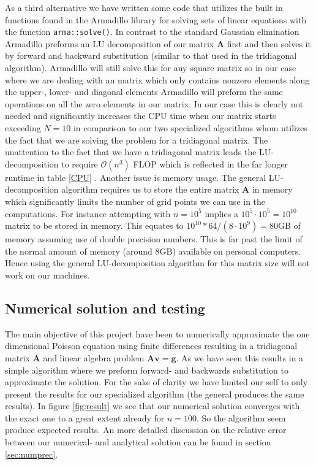 \documentclass[12pt]{article}
\numberwithin{figure}{section}
\numberwithin{table}{section}
\begin{document}
\noindent As a third alternative we have written some code that utilizes the built in functions found in the Armadillo library\cite{Arma} for solving sets of linear equations with the function \texttt{arma::solve()}. In contrast to the standard Gaussian elimination Armadillo preforms an LU decomposition of our matrix $\mathbf{A}$ first and then solves it by forward and backward substitution (similar to that used in the tridiagonal algorithm). Armadillo will still solve this for any square matrix so in our case where we are dealing with an matrix which only contains nonzero elements along the upper-, lower- and diagonal elements Armadillo will preform the same operations on all the zero elements in our matrix. In our case this is clearly not needed and significantly increases the CPU time when our matrix starts exceeding $N=10$ in comparison to our two specialized algorithms whom utilizes the fact that we are solving the problem for a tridiagonal matrix. The unattention to the fact that we have a tridiagonal matrix leads the LU-decomposition to require $\mathcal{O}(n^3)$ FLOP which is reflected in the far longer runtime in table \ref{CPU} \cite{Comp}. Another issue is memory usage. The general LU-decomposition algorithm requires us to store the entire matrix $\mathbf{A}$ in memory which significantly limits the number of grid points we can use in the computations. For instance attempting with $n=10^5$ implies a $10^5\cdot10^5=10^{10}$ matrix to be stored in memory. This equates to $10^{10}*64/(8\cdot 10^9)=80$GB of memory assuming use of double precision numbers. This is far past the limit of the normal amount of memory (around 8GB) available on personal computers. Hence using the general LU-decomposition algorithm for this matrix size will not work on our machines.


\subsection{Numerical solution and testing}

\noindent The main objective of this project have been to numerically approximate the one dimensional Poisson equation using finite differences resulting in a tridiagonal matrix $\mathbf{A}$ and linear algebra problem $\mathbf{A} \mathbf{v} = \mathbf{g}$. As we have seen this results in a simple algorithm where we preform forward- and backwards substitution to approximate the solution. For the sake of clarity we have limited our self to only present the results for our specialized algorithm (the general produces the same results). In figure \ref{fig:result} we see that our numerical solution converges with the exact one to a great extent already for $n=100$. So the algorithm seem produce expected results. An more detailed discussion on the relative error between our numerical- and analytical solution can be found in section \ref{sec:numprec}.\\ 
\end{document}
